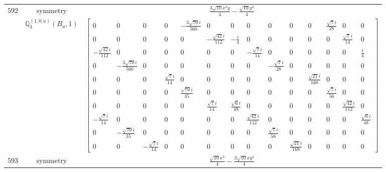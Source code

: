 \documentclass[fleqn,8pt,landscape]{jsarticle}
\begin{document}
\begin{longtable}{ccc}
$ 592 $ & $ \text{symmetry} $ & $ \frac{3 \sqrt{10} x^{2} y}{4} - \frac{\sqrt{10} y^{3}}{4} $ \\
$  $ & $ \mathbb{Q}_{3}^{(1,0;a)}(B_{u},1) $ & $ \begin{bmatrix} 0 & 0 & 0 & 0 & - \frac{3 \sqrt{70} i}{560} & 0 & 0 & 0 & 0 & 0 & 0 & \frac{\sqrt{7} i}{28} & 0 & 0 \\ 0 & 0 & 0 & 0 & 0 & - \frac{\sqrt{42} i}{112} & - \frac{i}{4} & 0 & 0 & 0 & 0 & 0 & \frac{\sqrt{7} i}{14} & 0 \\ - \frac{\sqrt{42} i}{112} & 0 & 0 & 0 & 0 & 0 & 0 & - \frac{\sqrt{7} i}{14} & 0 & 0 & 0 & 0 & 0 & \frac{i}{4} \\ 0 & - \frac{3 \sqrt{70} i}{560} & 0 & 0 & 0 & 0 & 0 & 0 & - \frac{\sqrt{7} i}{28} & 0 & 0 & 0 & 0 & 0 \\ 0 & 0 & 0 & \frac{\sqrt{7} i}{14} & 0 & 0 & 0 & 0 & 0 & 0 & \frac{\sqrt{21} i}{168} & 0 & 0 & 0 \\ 0 & 0 & 0 & 0 & \frac{\sqrt{70} i}{35} & 0 & 0 & 0 & 0 & 0 & 0 & \frac{\sqrt{7} i}{56} & 0 & 0 \\ 0 & 0 & 0 & 0 & 0 & \frac{\sqrt{7} i}{14} & \frac{\sqrt{6} i}{48} & 0 & 0 & 0 & 0 & 0 & \frac{\sqrt{42} i}{112} & 0 \\ - \frac{\sqrt{7} i}{14} & 0 & 0 & 0 & 0 & 0 & 0 & \frac{\sqrt{42} i}{112} & 0 & 0 & 0 & 0 & 0 & \frac{\sqrt{6} i}{48} \\ 0 & - \frac{\sqrt{70} i}{35} & 0 & 0 & 0 & 0 & 0 & 0 & \frac{\sqrt{7} i}{56} & 0 & 0 & 0 & 0 & 0 \\ 0 & 0 & - \frac{\sqrt{7} i}{14} & 0 & 0 & 0 & 0 & 0 & 0 & \frac{\sqrt{21} i}{168} & 0 & 0 & 0 & 0 \end{bmatrix} $ \\ \hline
$ 593 $ & $ \text{symmetry} $ & $ \frac{\sqrt{10} x^{3}}{4} - \frac{3 \sqrt{10} x y^{2}}{4} $ \\

\end{longtable}
\end{document}
